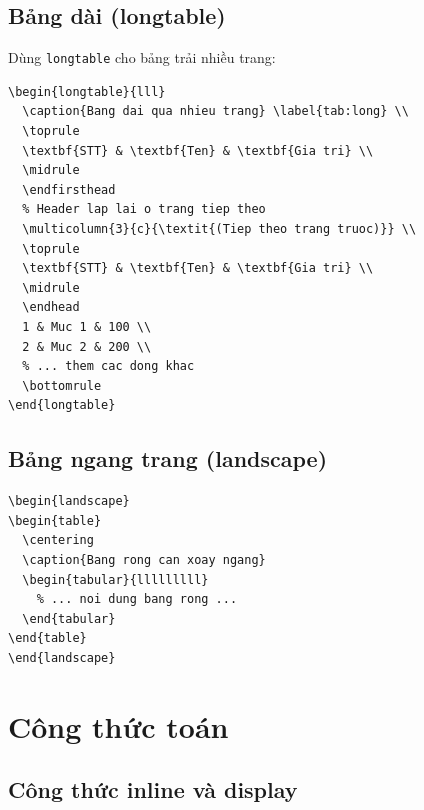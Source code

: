 \subsection{Bảng dài (longtable)}

Dùng \texttt{longtable} cho bảng trải nhiều trang:

\begin{lstlisting}[style=latexstyle, caption={Bảng dài qua nhiều trang}]
\begin{longtable}{lll}
  \caption{Bang dai qua nhieu trang} \label{tab:long} \\
  \toprule
  \textbf{STT} & \textbf{Ten} & \textbf{Gia tri} \\
  \midrule
  \endfirsthead
  % Header lap lai o trang tiep theo
  \multicolumn{3}{c}{\textit{(Tiep theo trang truoc)}} \\
  \toprule
  \textbf{STT} & \textbf{Ten} & \textbf{Gia tri} \\
  \midrule
  \endhead
  1 & Muc 1 & 100 \\
  2 & Muc 2 & 200 \\
  % ... them cac dong khac
  \bottomrule
\end{longtable}
\end{lstlisting}

\subsection{Bảng ngang trang (landscape)}

\begin{lstlisting}[style=latexstyle, caption={Xoay bảng ngang trang}]
\begin{landscape}
\begin{table}
  \centering
  \caption{Bang rong can xoay ngang}
  \begin{tabular}{lllllllll}
    % ... noi dung bang rong ...
  \end{tabular}
\end{table}
\end{landscape}
\end{lstlisting}

\section{Công thức toán}
\label{sec:math}

\subsection{Công thức inline và display}

